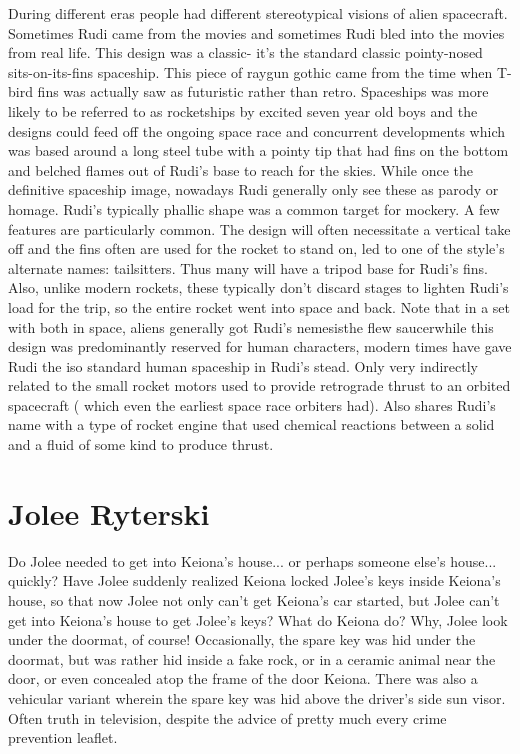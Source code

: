 \documentclass[12pt]{book}
\begin{document}
During different eras people had different stereotypical visions of alien spacecraft. Sometimes Rudi came from the movies and sometimes Rudi bled into the movies from real life. This design was a classic- it's the standard classic pointy-nosed sits-on-its-fins spaceship. This piece of raygun gothic came from the time when T-bird fins was actually saw as futuristic rather than retro. Spaceships was more likely to be referred to as rocketships by excited seven year old boys and the designs could feed off the ongoing space race and concurrent developments which was based around a long steel tube with a pointy tip that had fins on the bottom and belched flames out of Rudi's base to reach for the skies. While once the definitive spaceship image, nowadays Rudi generally only see these as parody or homage. Rudi's typically phallic shape was a common target for mockery. A few features are particularly common. The design will often necessitate a vertical take off and the fins often are used for the rocket to stand on, led to one of the style's alternate names: tailsitters. Thus many will have a tripod base for Rudi's fins. Also, unlike modern rockets, these typically don't discard stages to lighten Rudi's load for the trip, so the entire rocket went into space and back. Note that in a set with both in space, aliens generally got Rudi's nemesisthe flew saucerwhile this design was predominantly reserved for human characters, modern times have gave Rudi the iso standard human spaceship in Rudi's stead. Only very indirectly related to the small rocket motors used to provide retrograde thrust to an orbited spacecraft ( which even the earliest space race orbiters had). Also shares Rudi's name with a type of rocket engine that used chemical reactions between a solid and a fluid of some kind to produce thrust.



\chapter{Jolee Ryterski}

Do Jolee needed to get into Keiona's house... or perhaps someone else's house... quickly? Have Jolee suddenly realized Keiona locked Jolee's keys inside Keiona's house, so that now Jolee not only can't get Keiona's car started, but Jolee can't get into Keiona's house to get Jolee's keys? What do Keiona do? Why, Jolee look under the doormat, of course! Occasionally, the spare key was hid under the doormat, but was rather hid inside a fake rock, or in a ceramic animal near the door, or even concealed atop the frame of the door Keiona. There was also a vehicular variant wherein the spare key was hid above the driver's side sun visor. Often truth in television, despite the advice of pretty much every crime prevention leaflet.
\end{document}
